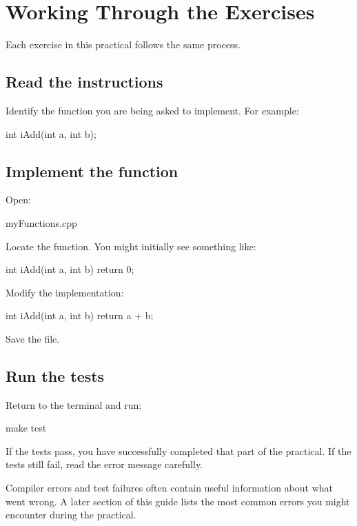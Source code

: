 \documentclass{csc2059practical}
\begin{document}
\section{Working Through the Exercises}

Each exercise in this practical follows the same process.

\subsection{Read the instructions}

Identify the function you are being asked to implement. For example:

\begin{cppcode}
int iAdd(int a, int b);
\end{cppcode}

\subsection{Implement the function}

Open:

\begin{terminal}
myFunctions.cpp
\end{terminal}

Locate the function. You might initially see something like:

\begin{cppcode}
int iAdd(int a, int b)
{
    return 0;
}
\end{cppcode}

Modify the implementation:

\begin{cppcode}
int iAdd(int a, int b)
{
    return a + b;
}
\end{cppcode}

Save the file.

\subsection{Run the tests}

Return to the terminal and run:

\begin{bashcode}
make test
\end{bashcode}

If the tests pass, you have successfully completed that part of the practical. If the tests still fail, read the error message carefully.

Compiler errors and test failures often contain useful information about what went wrong. A later section of this guide lists the most common errors you might encounter during the practical.
\end{document}
